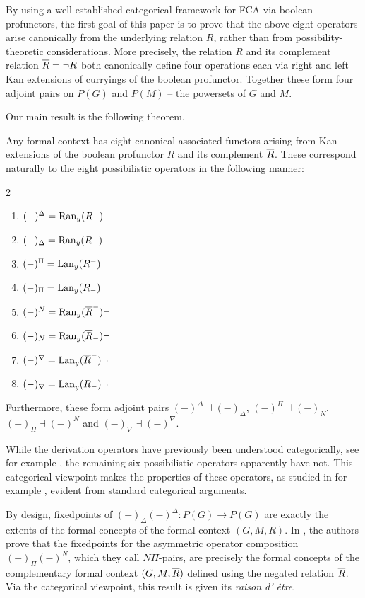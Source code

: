 By using a well established categorical framework for FCA via boolean profunctors, the first goal of this paper is to prove that the above eight operators arise canonically from the underlying relation $R$, rather than from possibility-theoretic considerations. More precisely, the relation $R$ and its complement relation $\overline{R} = \neg R$ both canonically define four operations each via right and left Kan extensions of curryings of the boolean profunctor. Together these form four adjoint pairs on $P(G)$ and $P(M)$ -- the powersets of $G$ and $M$. 

Our main result is the following theorem. 

\begin{introthm}
    Any formal context has eight canonical associated functors arising from Kan extensions of the boolean profunctor $R$ and its complement $\overline{R}$. These correspond naturally to the eight possibilistic operators in the following manner:
    \begin{multicols}{2}
    \begin{enumerate}
        \item $(-)^\Delta = \operatorname{Ran}_y(R^-)$
        \item $(-)_\Delta = \operatorname{Ran}_y(R_-)$
        \item $(-)^\Pi = \operatorname{Lan}_y(R^-)$
        \item $(-)_\Pi = \operatorname{Lan}_y(R_-)$
        \item $(-)^N = \operatorname{Ran}_y(\overline{R}^-)\neg$
        \item $(-)_N = \operatorname{Ran}_y(\overline{R}_-)\neg$
        \item $(-)^\nabla = \operatorname{Lan}_y(\overline{R}^-)\neg$
        \item $(-)_\nabla = \operatorname{Lan}_y(\overline{R}_-)\neg$
    \end{enumerate}
    \end{multicols}
    Furthermore, these form adjoint pairs $(-)^\Delta\dashv (-)_\Delta$, $(-)^\Pi\dashv (-)_N$, $(-)_\Pi\dashv (-)^N$ and $(-)_\nabla\dashv (-)^\nabla$. 
\end{introthm}

While the derivation operators have previously been understood categorically, see for example \cite{ferrer_2023}, the remaining six possibilistic operators apparently have not. This categorical viewpoint makes the properties of these operators, as studied in for example \cite{djouadi_prade_2011}, evident from standard categorical arguments. 

By design, fixedpoints of $(-)_\Delta (-)^\Delta : P(G) \to P(G)$ are exactly the extents of the formal concepts of the formal context $(G,M,R)$. In \cite{djouadi_prade_2011, yakub-djouadi-dubois-prade_2016}, the authors prove that the fixedpoints for the asymmetric operator composition $(-)_\Pi (-)^N$, which they call $N\Pi$-pairs, are precisely the formal concepts of the complementary formal context $(G,M,\overline{R})$ defined using the negated relation $\overline{R}$. Via the categorical viewpoint, this result is given its \emph{raison d'
être}. 

